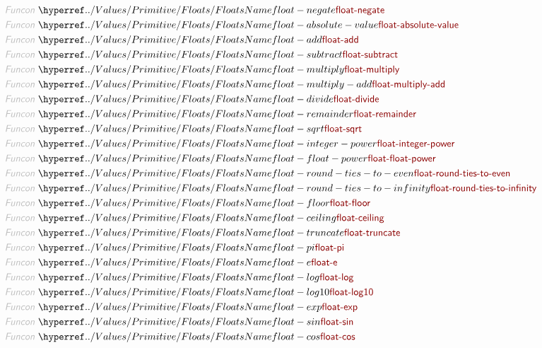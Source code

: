 \begin{align*}
  \KEY{Funcon} ~ & \NAMEHYPER{../Values/Primitive}{Floats}{float-negate} \\
  \KEY{Funcon} ~ & \NAMEHYPER{../Values/Primitive}{Floats}{float-absolute-value} \\
  \KEY{Funcon} ~ & \NAMEHYPER{../Values/Primitive}{Floats}{float-add} \\
  \KEY{Funcon} ~ & \NAMEHYPER{../Values/Primitive}{Floats}{float-subtract} \\
  \KEY{Funcon} ~ & \NAMEHYPER{../Values/Primitive}{Floats}{float-multiply} \\
  \KEY{Funcon} ~ & \NAMEHYPER{../Values/Primitive}{Floats}{float-multiply-add} \\
  \KEY{Funcon} ~ & \NAMEHYPER{../Values/Primitive}{Floats}{float-divide} \\
  \KEY{Funcon} ~ & \NAMEHYPER{../Values/Primitive}{Floats}{float-remainder} \\
  \KEY{Funcon} ~ & \NAMEHYPER{../Values/Primitive}{Floats}{float-sqrt} \\
  \KEY{Funcon} ~ & \NAMEHYPER{../Values/Primitive}{Floats}{float-integer-power} \\
  \KEY{Funcon} ~ & \NAMEHYPER{../Values/Primitive}{Floats}{float-float-power} \\
  \KEY{Funcon} ~ & \NAMEHYPER{../Values/Primitive}{Floats}{float-round-ties-to-even} \\
  \KEY{Funcon} ~ & \NAMEHYPER{../Values/Primitive}{Floats}{float-round-ties-to-infinity} \\
  \KEY{Funcon} ~ & \NAMEHYPER{../Values/Primitive}{Floats}{float-floor} \\
  \KEY{Funcon} ~ & \NAMEHYPER{../Values/Primitive}{Floats}{float-ceiling} \\
  \KEY{Funcon} ~ & \NAMEHYPER{../Values/Primitive}{Floats}{float-truncate} \\
  \KEY{Funcon} ~ & \NAMEHYPER{../Values/Primitive}{Floats}{float-pi} \\
  \KEY{Funcon} ~ & \NAMEHYPER{../Values/Primitive}{Floats}{float-e} \\
  \KEY{Funcon} ~ & \NAMEHYPER{../Values/Primitive}{Floats}{float-log} \\
  \KEY{Funcon} ~ & \NAMEHYPER{../Values/Primitive}{Floats}{float-log10} \\
  \KEY{Funcon} ~ & \NAMEHYPER{../Values/Primitive}{Floats}{float-exp} \\
  \KEY{Funcon} ~ & \NAMEHYPER{../Values/Primitive}{Floats}{float-sin} \\
  \KEY{Funcon} ~ & \NAMEHYPER{../Values/Primitive}{Floats}{float-cos} \\

\end{align*}
